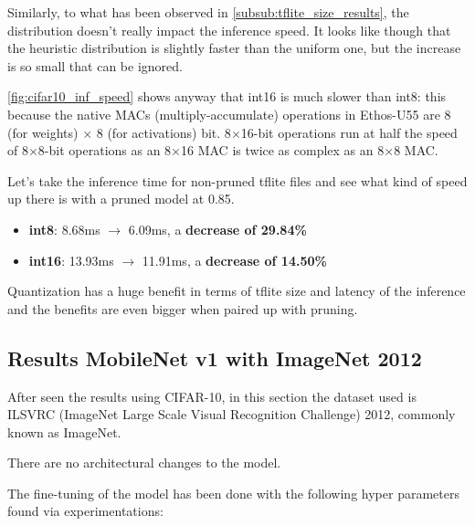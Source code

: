 Similarly, to what has been observed in \autoref{subsub:tflite_size_results},
the distribution doesn't really impact the inference speed.
It looks like though that the heuristic distribution is slightly faster than
the uniform one, but the increase is so small that can be ignored.

\autoref{fig:cifar10_inf_speed} shows anyway that int16 is much slower than
int8: this because the native MACs (multiply-accumulate) operations in
Ethos-U55 are 8 (for weights) $\times$ 8 (for activations) bit.
8$\times$16-bit operations run at half the speed of 8$\times$8-bit
operations as an 8$\times$16 MAC is twice as complex as an 8$\times$8 MAC\@.

Let's take the inference time for non-pruned tflite files and see what kind of
speed up there is with a pruned model at 0.85.

\begin{itemize}
    \item \textbf{int8}: 8.68ms $\rightarrow$ 6.09ms, a \textbf{decrease of 29.84\%}
    \item \textbf{int16}: 13.93ms $\rightarrow$ 11.91ms, a \textbf{decrease of 14.50\%}
\end{itemize}

Quantization has a huge benefit in terms of tflite size and latency of the
inference and the benefits are even bigger when paired up with pruning.

\subsection{Results MobileNet v1 with ImageNet 2012}
After seen the results using CIFAR-10, in this section the dataset used is
ILSVRC (ImageNet Large Scale Visual Recognition Challenge) 2012, commonly known
as ImageNet.

There are no architectural changes to the model.

The fine-tuning of the model has been done with the following hyper parameters
found via experimentations:

